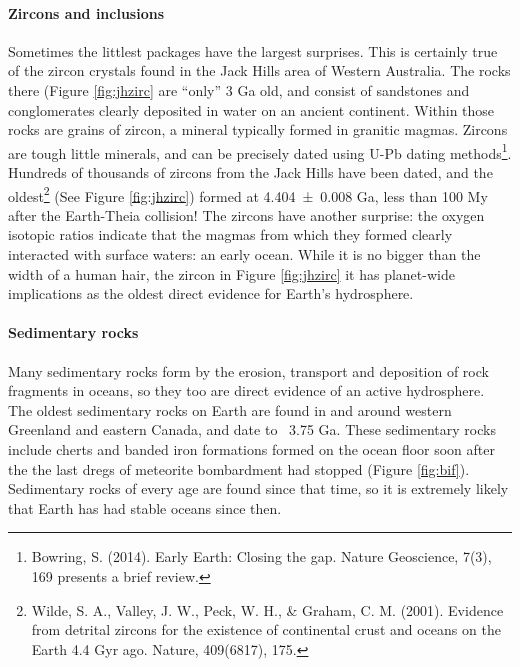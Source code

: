 {\paragraph{Zircons and inclusions}
Sometimes the littlest packages have the largest surprises. This is certainly true of the zircon crystals found in the Jack Hills area of Western Australia. The rocks there (Figure \ref{fig:jhzirc} are ``only'' 3 Ga old, and consist of sandstones and conglomerates clearly deposited in water on an ancient continent. Within those rocks are grains of zircon, a mineral typically formed in granitic magmas. Zircons are tough little minerals, and can be precisely dated using U-Pb dating methods\footnote{Bowring, S. (2014). Early Earth: Closing the gap. Nature Geoscience, 7(3), 169 presents a brief review.}. Hundreds of thousands of zircons from the Jack Hills have been dated, and the oldest\footnote{Wilde, S. A., Valley, J. W., Peck, W. H., \& Graham, C. M. (2001). Evidence from detrital zircons for the existence of continental crust and oceans on the Earth 4.4 Gyr ago. Nature, 409(6817), 175.} (See Figure \ref{fig:jhzirc}) formed at \num[separate-uncertainty = true]{4.404(8)} Ga, less than 100 My after the Earth-Theia collision! The zircons have another surprise: the oxygen isotopic ratios indicate that the magmas from which they formed clearly interacted with surface waters: an early ocean. While it is no bigger than the width of a human hair, the zircon in Figure \ref{fig:jhzirc} it has planet-wide implications as the oldest direct evidence for Earth's hydrosphere.    
\paragraph{Sedimentary rocks}
Many sedimentary rocks form by the erosion, transport and deposition of rock fragments in oceans, so they too are direct evidence of an active hydrosphere. The oldest sedimentary rocks on Earth are found in and around western Greenland and eastern Canada, and date to ~3.75 Ga. These sedimentary rocks include cherts and banded iron formations formed on the ocean floor soon after the the last dregs of meteorite bombardment had stopped (Figure \ref{fig:bif}). Sedimentary rocks of every age are found since that time, so it is extremely likely that Earth has had stable oceans since then.

}
